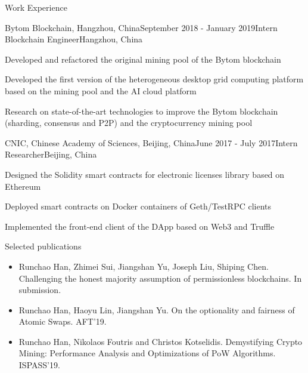 \documentclass{resume} %
\begin{document}

\begin{rSection}{Work Experience}

\begin{rSubsection}{Bytom Blockchain, Hangzhou, China}{September 2018 - January 2019}{Intern Blockchain Engineer}{Hangzhou, China}
\item Developed and refactored the original mining pool of the Bytom blockchain
\item Developed the first version of the heterogeneous desktop grid computing platform based on the mining pool and the AI cloud platform
\item Research on state-of-the-art technologies to improve the Bytom blockchain (sharding, consensus and P2P) and the cryptocurrency mining pool
\end{rSubsection}

\begin{rSubsection}{CNIC, Chinese Academy of Sciences, Beijing, China}{June 2017 - July 2017}{Intern Researcher}{Beijing, China}
\item Designed the Solidity smart contracts for electronic licenses library based on Ethereum
\item Deployed smart contracts on Docker containers of Geth/TestRPC clients
\item Implemented the front-end client of the DApp based on Web3 and Truffle
\end{rSubsection}

\end{rSection}




\begin{rSection}{Selected publications} 

\begin{itemize}
    \item Runchao Han, Zhimei Sui, Jiangshan Yu, Joseph Liu, Shiping Chen. Challenging the honest majority assumption of permissionless blockchains. In submission.
    \item Runchao Han, Haoyu Lin, Jiangshan Yu. On the optionality and fairness of Atomic Swaps. AFT'19.
    \item Runchao Han, Nikolaos Foutris and Christos Kotselidis. Demystifying Crypto Mining: Performance Analysis and Optimizations of PoW Algorithms. ISPASS'19.
\end{itemize}

\end{rSection}
\end{document}
